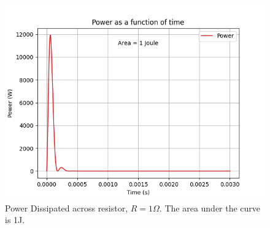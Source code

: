\documentclass[journal,12pt,twocolumn]{IEEEtran}
\theoremstyle{remark}
\begin{document}
\begin{figure}[H]
    \includegraphics[width=1\columnwidth]{figs/Power_Dissipated_across_Resistor.png }
    \caption{Power Dissipated across resistor, $R=1\Omega$. The area under the curve is 1J.}
    \label{fig:power_in_damping}
\end{figure}
\end{document}
